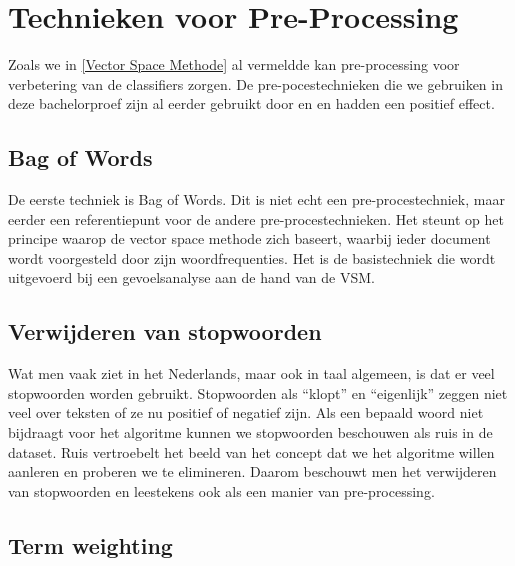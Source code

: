 \section{Technieken voor Pre-Processing}\label{Technieken voor Pre-Processing}

Zoals we in \ref{Vector Space Methode} al vermeldde kan pre-processing voor verbetering van de classifiers zorgen. De pre-pocestechnieken die we gebruiken in deze bachelorproef zijn al eerder gebruikt door \cite{pang2002thumbs} en \cite{wang2011sentiment} en hadden een positief effect.

\subsection{Bag of Words}\label{Bag of Words}

De eerste techniek is Bag of Words. Dit is niet echt een pre-procestechniek, maar eerder een referentiepunt voor de andere pre-procestechnieken. Het steunt op het principe waarop de vector space methode zich baseert, waarbij ieder document wordt voorgesteld door zijn woordfrequenties. Het is de basistechniek die wordt uitgevoerd bij een gevoelsanalyse aan de hand van de VSM. 

\subsection{Verwijderen van stopwoorden}\label{Verwijderen van stopwoorden en leestekens}

Wat men vaak ziet in het Nederlands, maar ook in taal algemeen, is dat er veel stopwoorden worden gebruikt. Stopwoorden als ``klopt'' en ``eigenlijk'' zeggen niet veel over teksten of ze nu positief of negatief zijn. Als een bepaald woord niet bijdraagt voor het algoritme kunnen we stopwoorden beschouwen als ruis in de dataset. Ruis vertroebelt het beeld van het concept dat we het algoritme willen aanleren en proberen we te elimineren. Daarom beschouwt men het verwijderen van stopwoorden en leestekens ook als een manier van pre-processing.

\subsection{Term weighting}\label{Term weighting}

